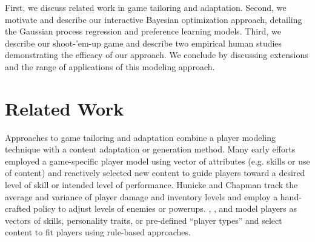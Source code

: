\documentclass[letterpaper]{article}
\begin{document}

First, we discuss related work in game tailoring and adaptation. Second, we motivate and describe our interactive Bayesian optimization approach, detailing the Gaussian process regression and preference learning models. Third, we describe our shoot-'em-up game and describe two empirical human studies demonstrating the efficacy of our approach. We conclude by discussing extensions and the range of applications of this modeling approach.



\section{Related Work}


Approaches to game tailoring and adaptation combine a player modeling technique with a content adaptation or generation method. Many early efforts employed a game-specific player model using vector of attributes (e.g. skills or use of content) and reactively selected new content to guide players toward a desired level of skill or intended level of performance. Hunicke and Chapman  track the average and variance of player damage and inventory levels and employ a hand-crafted policy to adjust levels of enemies or powerups. \cite{magerko2006:isat}, \cite{el-nasr2007}, and \cite{thue2007:storytell-pm} model players as vectors of skills, personality traits, or pre-defined ``player types'' and select content to fit players using rule-based approaches. 
\end{document}
